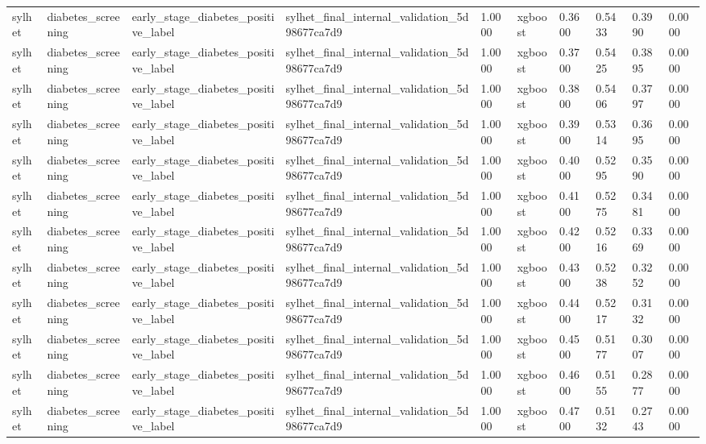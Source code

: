 \begin{tabular}{llllllllll}
sylhet & diabetes\_screening & early\_stage\_diabetes\_positive\_label & sylhet\_final\_internal\_validation\_5d98677ca7d9 & 1.0000 & xgboost & 0.3600 & 0.5433 & 0.3990 & 0.0000 \\
sylhet & diabetes\_screening & early\_stage\_diabetes\_positive\_label & sylhet\_final\_internal\_validation\_5d98677ca7d9 & 1.0000 & xgboost & 0.3700 & 0.5425 & 0.3895 & 0.0000 \\
sylhet & diabetes\_screening & early\_stage\_diabetes\_positive\_label & sylhet\_final\_internal\_validation\_5d98677ca7d9 & 1.0000 & xgboost & 0.3800 & 0.5406 & 0.3797 & 0.0000 \\
sylhet & diabetes\_screening & early\_stage\_diabetes\_positive\_label & sylhet\_final\_internal\_validation\_5d98677ca7d9 & 1.0000 & xgboost & 0.3900 & 0.5314 & 0.3695 & 0.0000 \\
sylhet & diabetes\_screening & early\_stage\_diabetes\_positive\_label & sylhet\_final\_internal\_validation\_5d98677ca7d9 & 1.0000 & xgboost & 0.4000 & 0.5295 & 0.3590 & 0.0000 \\
sylhet & diabetes\_screening & early\_stage\_diabetes\_positive\_label & sylhet\_final\_internal\_validation\_5d98677ca7d9 & 1.0000 & xgboost & 0.4100 & 0.5275 & 0.3481 & 0.0000 \\
sylhet & diabetes\_screening & early\_stage\_diabetes\_positive\_label & sylhet\_final\_internal\_validation\_5d98677ca7d9 & 1.0000 & xgboost & 0.4200 & 0.5216 & 0.3369 & 0.0000 \\
sylhet & diabetes\_screening & early\_stage\_diabetes\_positive\_label & sylhet\_final\_internal\_validation\_5d98677ca7d9 & 1.0000 & xgboost & 0.4300 & 0.5238 & 0.3252 & 0.0000 \\
sylhet & diabetes\_screening & early\_stage\_diabetes\_positive\_label & sylhet\_final\_internal\_validation\_5d98677ca7d9 & 1.0000 & xgboost & 0.4400 & 0.5217 & 0.3132 & 0.0000 \\
sylhet & diabetes\_screening & early\_stage\_diabetes\_positive\_label & sylhet\_final\_internal\_validation\_5d98677ca7d9 & 1.0000 & xgboost & 0.4500 & 0.5177 & 0.3007 & 0.0000 \\
sylhet & diabetes\_screening & early\_stage\_diabetes\_positive\_label & sylhet\_final\_internal\_validation\_5d98677ca7d9 & 1.0000 & xgboost & 0.4600 & 0.5155 & 0.2877 & 0.0000 \\
sylhet & diabetes\_screening & early\_stage\_diabetes\_positive\_label & sylhet\_final\_internal\_validation\_5d98677ca7d9 & 1.0000 & xgboost & 0.4700 & 0.5132 & 0.2743 & 0.0000 \\

\end{tabular}
